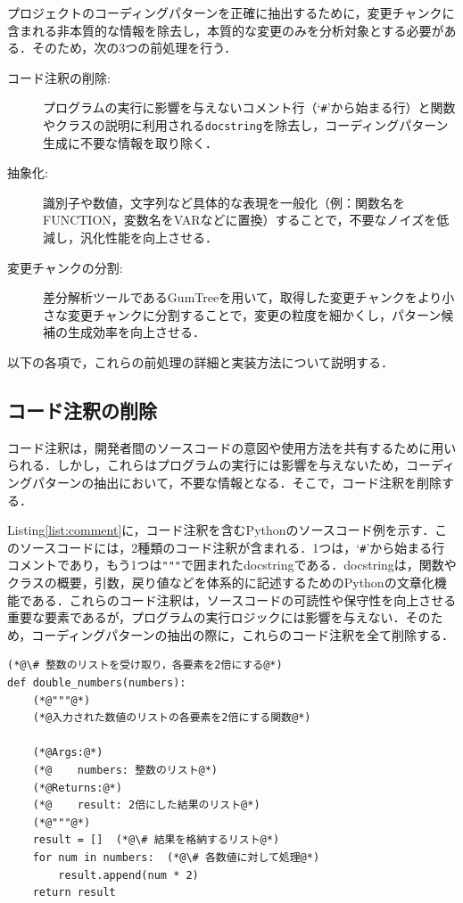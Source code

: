 \documentclass[11pt]{jreport}
\begin{document}
プロジェクトのコーディングパターンを正確に抽出するために，変更チャンクに含まれる非本質的な情報を除去し，本質的な変更のみを分析対象とする必要がある．そのため，次の3つの前処理を行う．
\begin{description}
    \item[コード注釈の削除:]プログラムの実行に影響を与えないコメント行（`\texttt{\#}'から始まる行）と関数やクラスの説明に利用される\texttt{docstring}を除去し，コーディングパターン生成に不要な情報を取り除く．
    \item[抽象化:]識別子や数値，文字列など具体的な表現を一般化（例：関数名をFUNCTION，変数名をVARなどに置換）することで，不要なノイズを低減し，汎化性能を向上させる．
    \item[変更チャンクの分割:]差分解析ツールであるGumTree\cite{gumtree}を用いて，取得した変更チャンクをより小さな変更チャンクに分割することで，変更の粒度を細かくし，パターン候補の生成効率を向上させる．
\end{description}
以下の各項で，これらの前処理の詳細と実装方法について説明する．
\subsection{コード注釈の削除}
コード注釈は，開発者間のソースコードの意図や使用方法を共有するために用いられる．しかし，これらはプログラムの実行には影響を与えないため，コーディングパターンの抽出において，不要な情報となる．そこで，コード注釈を削除する．

Listing\ref{list:comment}に，コード注釈を含むPythonのソースコード例を示す．このソースコードには，2種類のコード注釈が含まれる．1つは，`\texttt{\#}'から始まる行コメントであり，もう1つは\texttt{"""}で囲まれたdocstringである．docstringは，関数やクラスの概要，引数，戻り値などを体系的に記述するためのPythonの文章化機能である．これらのコード注釈は，ソースコードの可読性や保守性を向上させる重要な要素であるが，プログラムの実行ロジックには影響を与えない．そのため，コーディングパターンの抽出の際に，これらのコード注釈を全て削除する．


\begin{lstlisting}[caption=コード注釈の入ったソースコード,label=list:comment]
(*@\# 整数のリストを受け取り，各要素を2倍にする@*)
def double_numbers(numbers):
    (*@"""@*)
    (*@入力された数値のリストの各要素を2倍にする関数@*)
    
    (*@Args:@*)
    (*@    numbers: 整数のリスト@*)
    (*@Returns:@*)
    (*@    result: 2倍にした結果のリスト@*)
    (*@"""@*)
    result = []  (*@\# 結果を格納するリスト@*)
    for num in numbers:  (*@\# 各数値に対して処理@*)
        result.append(num * 2)
    return result
\end{lstlisting}
\end{document}
